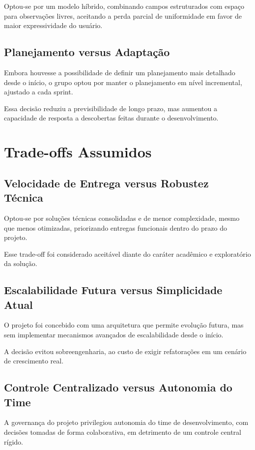 Optou-se por um modelo híbrido, combinando campos estruturados com espaço para observações livres, aceitando a perda parcial de uniformidade em favor de maior expressividade do usuário.

\subsection{Planejamento versus Adaptação}

Embora houvesse a possibilidade de definir um planejamento mais detalhado desde o início, o grupo optou por manter o planejamento em nível incremental, ajustado a cada sprint.

Essa decisão reduziu a previsibilidade de longo prazo, mas aumentou a capacidade de resposta a descobertas feitas durante o desenvolvimento.

\section{Trade-offs Assumidos}

\subsection{Velocidade de Entrega versus Robustez Técnica}

Optou-se por soluções técnicas consolidadas e de menor complexidade, mesmo que menos otimizadas, priorizando entregas funcionais dentro do prazo do projeto.

Esse trade-off foi considerado aceitável diante do caráter acadêmico e exploratório da solução.

\subsection{Escalabilidade Futura versus Simplicidade Atual}

O projeto foi concebido com uma arquitetura que permite evolução futura, mas sem implementar mecanismos avançados de escalabilidade desde o início.

A decisão evitou sobreengenharia, ao custo de exigir refatorações em um cenário de crescimento real.

\subsection{Controle Centralizado versus Autonomia do Time}

A governança do projeto privilegiou autonomia do time de desenvolvimento, com decisões tomadas de forma colaborativa, em detrimento de um controle central rígido.

